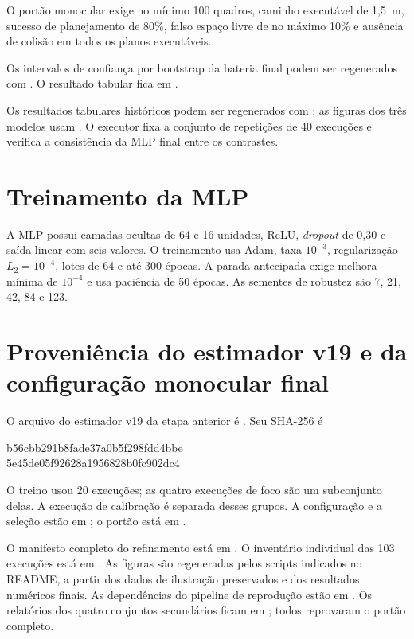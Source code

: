 \begin{apendicesenv}
O portão monocular exige no mínimo 100 quadros, caminho executável de 1,5~m, sucesso de planejamento de 80\%, falso espaço livre de no máximo 10\% e ausência de colisão em todos os planos executáveis.

Os intervalos de confiança por bootstrap da bateria final podem ser regenerados com . O resultado tabular fica em .

Os resultados tabulares históricos podem ser regenerados com ; as figuras dos três modelos usam . O executor fixa a conjunto de repetições de 40 execuções e verifica a consistência da MLP final entre os contrastes.


\section{Treinamento da MLP}

A MLP possui camadas ocultas de 64 e 16 unidades, ReLU, \textit{dropout} de 0,30 e saída linear com seis valores. O treinamento usa Adam, taxa $10^{-3}$, regularização $L_2=10^{-4}$, lotes de 64 e até 300 épocas. A parada antecipada exige melhora mínima de $10^{-4}$ e usa paciência de 50 épocas. As sementes de robustez são 7, 21, 42, 84 e 123.

\section{Proveniência do estimador v19 e da configuração monocular final}

O arquivo do estimador v19 da etapa anterior é . Seu SHA-256 é \begin{center}\small\ttfamily
b56cbb291b8fade37a0b5f298fdd4bbe\\
5e45de05f92628a1956828b0fc902dc4
\end{center}
\noindent O treino usou 20 execuções; as quatro execuções de foco são um subconjunto delas. A execução de calibração é separada desses grupos. A configuração e a seleção estão em ; o portão está em .

O manifesto completo do refinamento está em . O inventário individual das 103 execuções está em . As figuras são regeneradas pelos scripts indicados no README, a partir dos dados de ilustração preservados e dos resultados numéricos finais. As dependências do pipeline de reprodução estão em . Os relatórios dos quatro conjuntos secundários ficam em ; todos reprovaram o portão completo.




\end{apendicesenv}
